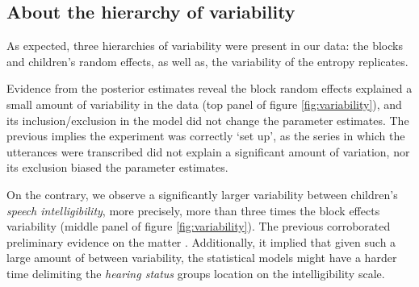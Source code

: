 \begin{comment}
“simplest” model (E_NC2b) provides
(preliminar) evidence on,
the higher the unaided PTA the
lower the child’s SI (bP[2])
(based on power analysis, we can be
sure is a small effect)
no apparent statistical difference
between NH and HI=CI children
(but this requires a CONTRAST)
for each “hearing” year, the SI
increases in approx 0:40 logits
(effect larger than the assumed in
power analysis)

however, the “interaction” model
(E_NC5b3) shows similar results on,
the small (still non-significant)
effects of the unaided PTA on the
child’s SI
similar explained variability across
levels and blocks
(similar to the “simplest” model)
but “mild” evidence of prevalent
interactions,
SI means for HI=CI per E,
aEHS[2; 2] (Genetic) vs
aEHS[3; 2] (CMV)
different SI evolution for NH vs
HI=CI children, per unit A
(bAHS),

within the “interaction” model,
the size of the data within groups
from combinations of E and HS,
does not allow to reject the
contrasts’ null hypothesis,
similar result is observed on the
bAHS contrast
(because the effect is small, compared
to children’s variability)
but we still observe differences
between NH and HI/CI, and even
within HI/CI by E,
therefore we decide to keep the
(E_NC5b3) model
\end{comment}
%
%
\subsection{About the hierarchy of variability} \label{sS:results_variability}
%
As expected, three hierarchies of variability were present in our data: the blocks and children's random effects, as well as, the variability of the entropy replicates.

Evidence from the posterior estimates reveal the block random effects explained a small amount of variability in the data (top panel of figure \ref{fig:variability}), and its inclusion/exclusion in the model did not change the parameter estimates. The previous implies the experiment was correctly `set up', as the series in which the utterances were transcribed did not explain a significant amount of variation, nor its exclusion biased the parameter estimates.

On the contrary, we observe a significantly larger variability between children's \textit{speech intelligibility}, more precisely, more than three times the block effects variability (middle panel of figure \ref{fig:variability}). The previous corroborated preliminary evidence on the matter \cite{Young_et_al_2002, Peng_et_al_2004, Montag_et_al_2014, Castellanos_et_al_2014, Yanbay_et_al_2014, Nittrouer_et_al_2014, Freeman_et_al_2017, Boonen_et_al_2021}. Additionally, it implied that given such a large amount of between variability, the statistical models might have a harder time delimiting the \textit{hearing status} groups location on the intelligibility scale.

